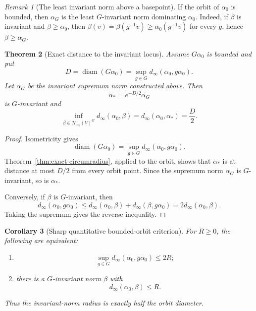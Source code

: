 \documentclass[12pt]{article}
\newtheorem{theorem}{Theorem}[section]
\newtheorem{corollary}[theorem]{Corollary}
\theoremstyle{definition}
\theoremstyle{remark}
\newtheorem{remark}[theorem]{Remark}
\newcommand{\Norm}{\mathscr N}
\newcommand{\dinf}{d_{\infty}}
\begin{document}
\begin{remark}[The least invariant norm above a basepoint]
If the orbit of $\alpha_0$ is bounded, then $\alpha_G$ is the least
$G$-invariant norm dominating $\alpha_0$.  Indeed, if $\beta$ is
invariant and $\beta\geq\alpha_0$, then
$\beta(v)=\beta(g^{-1}v)\geq\alpha_0(g^{-1}v)$ for every $g$, hence
$\beta\geq\alpha_G$.
\end{remark}


\begin{theorem}[Exact distance to the invariant locus]
\label{thm:exact-orbit-radius}
Assume \(G\alpha_0\) is bounded and put
\[
 D
 =
 \operatorname{diam}(G\alpha_0)
 =
 \sup_{g\in G}\dinf(\alpha_0,g\alpha_0).
\]
Let \(\alpha_G\) be the invariant supremum norm constructed above.  Then
\begin{equation}\label{eq:optimal-invariant-center}
 \alpha_*=e^{-D/2}\alpha_G
\end{equation}
is \(G\)-invariant and
\begin{equation}\label{eq:exact-distance-fixed-locus}
 \boxed{
 \inf_{\beta\in\Norm_{\alpha_0}(V)^G}
 \dinf(\alpha_0,\beta)
 =
 \dinf(\alpha_0,\alpha_*)
 =
 \frac D2.
 }
\end{equation}
\end{theorem}

\begin{proof}
Isometricity gives
\[
 \operatorname{diam}(G\alpha_0)
 =
 \sup_{g\in G}\dinf(\alpha_0,g\alpha_0).
\]
Theorem~\ref{thm:exact-circumradius}, applied to the orbit, shows that
\(\alpha_*\) is at distance at most \(D/2\) from every orbit point.  Since
the supremum norm \(\alpha_G\) is \(G\)-invariant, so is \(\alpha_*\).

Conversely, if \(\beta\) is \(G\)-invariant, then
\[
 \dinf(\alpha_0,g\alpha_0)
 \leq
 \dinf(\alpha_0,\beta)+
 \dinf(\beta,g\alpha_0)
 =
 2\dinf(\alpha_0,\beta).
\]
Taking the supremum gives the reverse inequality.
\end{proof}

\begin{corollary}[Sharp quantitative bounded-orbit criterion]
\label{cor:sharp-bounded-orbit}
For \(R\geq0\), the following are equivalent:
\begin{enumerate}
 \item
 \[
  \sup_{g\in G}\dinf(\alpha_0,g\alpha_0)\leq2R;
 \]
 \item there is a \(G\)-invariant norm \(\beta\) with
 \[
  \dinf(\alpha_0,\beta)\leq R.
 \]
\end{enumerate}
Thus the invariant-norm radius is exactly half the orbit diameter.
\end{corollary}
\end{document}
